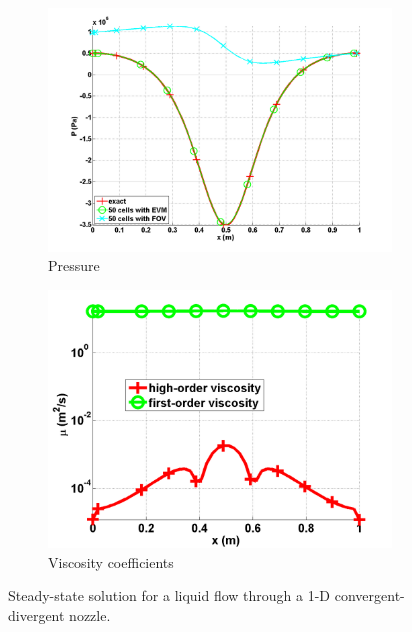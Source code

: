 \documentclass[preprint,10pt]{elsarticle}
\begin{document}
\begin{figure}[H]
        \begin{subfigure}[b]{0.495\textwidth}
                \centering
                \includegraphics[width=\textwidth]{liquid_pressure_numerical_and_exact_50.png}
                \caption{Pressure}
                \label{fig:1d_nozzle_liq_press}
        \end{subfigure}

        \begin{subfigure}[b]{0.495\textwidth}
                \centering
                \includegraphics[width=\textwidth]{liquid_viscosity_numerical50.png}
                \caption{Viscosity coefficients}
                \label{fig:1d_nozzle_liq_visc}
        \end{subfigure}
        \caption{Steady-state solution for a liquid flow through a 1-D convergent-divergent nozzle.}\label{fig:1d_liq_nozzle}
\end{figure}
\end{document}
